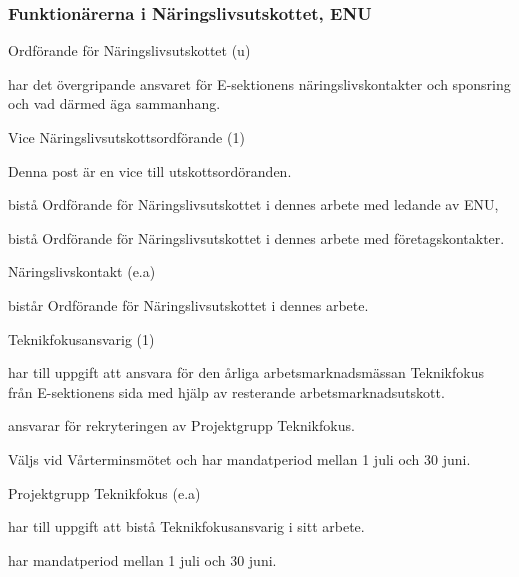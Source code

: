 \documentclass[10pt]{article}
\begin{document}
\subsubsection{Funktionärerna i Näringslivsutskottet, ENU}

\begin{emptylist}
    \item Ordförande för Näringslivsutskottet (u)
        \begin{dashlist}
            \item har det övergripande ansvaret för E-sektionens
                näringslivskontakter och sponsring och vad därmed äga
                sammanhang.
        \end{dashlist}
    \item Vice Näringslivsutskottsordförande (1)
        \begin{dashlist}
            \item Denna post är en vice till utskottsordöranden.
            \item bistå Ordförande för Näringslivsutskottet i dennes arbete med ledande av ENU,
            \item bistå Ordförande för Näringslivsutskottet i dennes arbete med företagskontakter.
        \end{dashlist}
    \item Näringslivskontakt (e.a)
        \begin{dashlist}
            \item bistår Ordförande för Näringslivsutskottet i dennes arbete.
        \end{dashlist}
    \item Teknikfokusansvarig (1)
    		\begin{dashlist}
    			\item har till uppgift att ansvara för den årliga arbetsmarknadsmässan Teknikfokus från E-sektionens sida med hjälp av resterande arbetsmarknadsutskott.
    			\item ansvarar för rekryteringen av Projektgrupp Teknikfokus.
                \item Väljs vid Vårterminsmötet och har mandatperiod mellan 1 juli och 30 juni.
    		\end{dashlist}
    	\item Projektgrupp Teknikfokus (e.a)
    		\begin{dashlist}
    			\item har till uppgift att bistå Teknikfokusansvarig i sitt arbete.
    			\item har mandatperiod mellan 1 juli och 30 juni.

\end{dashlist}
\end{emptylist}
\end{document}
